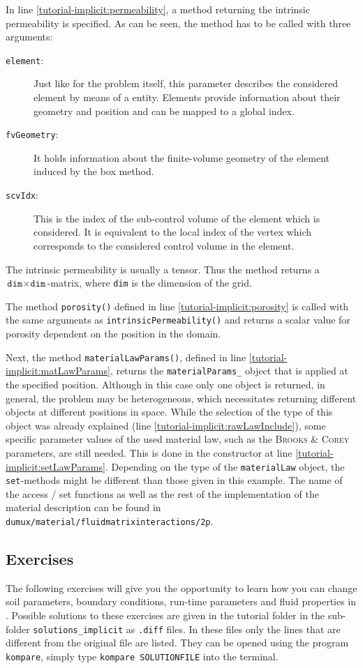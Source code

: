 In line \ref{tutorial-implicit:permeability}, a method returning the
intrinsic permeability is specified. As can be seen, the method has
to be called with three arguments:
\begin{description}
\item[\texttt{element}:] Just like for the problem itself, this
  parameter describes the considered element by means of a \Dune
  entity. Elements provide information about their geometry and
  position and can be mapped to a global index.
\item[\texttt{fvGeometry}:] It holds information about the finite-volume
  geometry of the element induced by the box method.
\item[\texttt{scvIdx}:] This is the index of the sub-control volume of the
  element which is considered. It is equivalent to the local index
  of the vertex which corresponds to the considered control volume in
  the element.
\end{description}

The intrinsic permeability is usually a tensor. Thus the method returns
a $\texttt{dim} \times \texttt{dim}$-matrix, where \texttt{dim} is the
dimension of the grid.

The method \texttt{porosity()} defined in line
\ref{tutorial-implicit:porosity} is called with the same arguments as
\texttt{intrinsicPermeability()} and returns a scalar value for
porosity dependent on the position in the domain.

Next, the method \texttt{materialLawParams()}, defined in line
\ref{tutorial-implicit:matLawParams}, returns the
\verb+materialParams_+ object that is applied at the specified
position. Although in this case only one object is returned, in
general, the problem may be heterogeneous, which necessitates
returning different objects at different positions in space.  While
the selection of the type of this object was already explained (line
\ref{tutorial-implicit:rawLawInclude}), some specific parameter values
of the used material law, such as the \textsc{Brooks} \&
\textsc{Corey} parameters, are still needed. This is done in the
constructor at line \ref{tutorial-implicit:setLawParams}.  Depending on
the type of the \texttt{materialLaw} object, the \texttt{set}-methods
might be different than those given in this example. The name of the
access / set functions as well as the rest of the implementation of
the material description can be found in
\verb+dumux/material/fluidmatrixinteractions/2p+.

\subsection{Exercises}
\label{tutorial-implicit:exercises}
The following exercises will give you the opportunity to learn how you
can change soil parameters, boundary conditions, run-time parameters
and fluid properties in \Dumux. Possible solutions to these exercises are given in the tutorial folder in the
sub-folder \texttt{solutions\_implicit} as \texttt{.diff} files. In these files only
the lines that are different from the original file are listed.
They can be opened using the program \texttt{kompare}, simply type \texttt{kompare SOLUTIONFILE} into the terminal.

